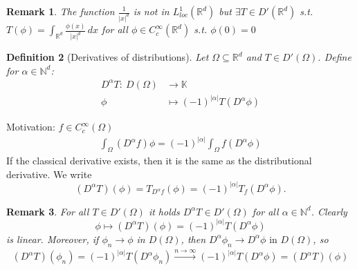 \documentclass{report}
\theoremstyle{tommy}
\newtheorem{defn}{Definition}
\newtheorem{rem}[defn]{Remark}
\begin{document}
  \begin{rem}
    The function \(\frac{1}{|x|^d}\) is not in \(L_{loc}^1(\mathbb{R}^d)\) but \(\exists T \in D'(\mathbb{R}^d)\) s.t. \(T(\phi) = \int_{\mathbb{R}^d} \frac{\phi(x)}{|x|^d} \, dx\) for all \(\phi \in C_c^\infty(\mathbb{R}^d)\) s.t. \(\phi(0) = 0\)
  \end{rem}

  \begin{defn}[Derivatives of distributions] 
    Let \(\Omega \subseteq \mathbb{R}^d\) and \(T \in D'(\Omega)\). Define for \(\alpha \in \mathbb{N}^d\): 
    \begin{align*}
      D^\alpha T: \ D(\Omega) &\longrightarrow \mathbb{K} \\
      \phi &\longmapsto (-1)^{|\alpha|}T(D^\alpha \phi)
    \end{align*}
    
  \end{defn}
  Motivation: \(f \in C_c^\infty(\Omega)\)
  \begin{align*}
    \int_\Omega(D^\alpha f) \phi = (-1)^{|\alpha|} \int_\Omega f(D^\alpha \phi)
  \end{align*}
  \glqq{}If the classical derivative exists, then it is the same as the distributional derivative.\grqq{} We write
  \[(D^\alpha T)(\phi) = T_{D^\alpha f} (\phi) = (-1)^{|\alpha|}T_f(D^\alpha \phi).\]
  
  \begin{rem}
    For all \(T \in D'(\Omega)\) it holds \(D^\alpha T \in D'(\Omega)\) for all \(\alpha \in \mathbb{N}^d\). Clearly
    \[\phi \longmapsto (D^\alpha T)(\phi) = (-1)^{|\alpha|}T(D^\alpha \phi)\] is linear. Moreover, if \(\phi_n \to \phi\) in \(D(\Omega)\), then \(D^\alpha \phi_n \to D^\alpha \phi \text{ in } D(\Omega)\), so
    \begin{align*}
      (D^\alpha T)(\phi_n) = (-1)^{|\alpha|} T(D^\alpha \phi_n) \xrightarrow{n \to \infty} (-1)^{|\alpha|} T(D^\alpha \phi) = (D^\alpha T)(\phi)
    \end{align*}
  \end{rem}
\end{document}
